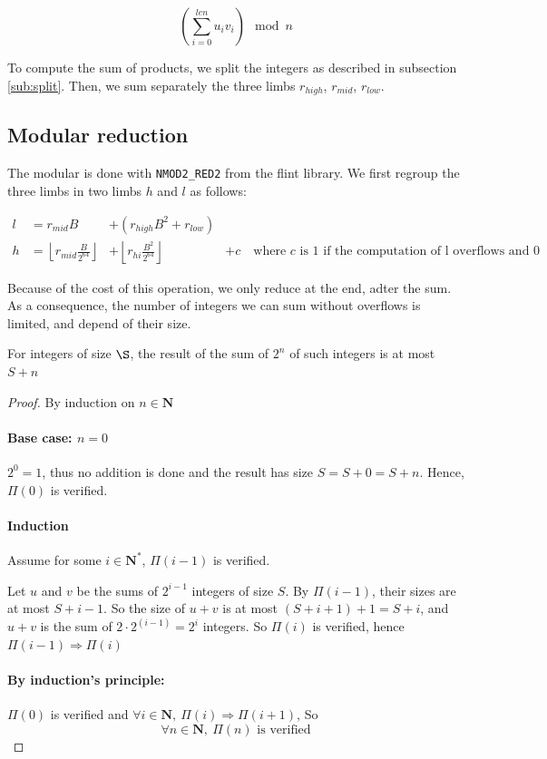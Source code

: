 \documentclass[a4paper]{article}
\begin{document}
\[\left(\sum_{i=0}^{len}u_iv_i\right) \mod n\]

To compute the sum of products, we split the integers as described in subsection \ref{sub:split}. Then, we sum separately the three limbs $r_{high}$, $r_{mid}$, $r_{low}$. %

\subsection{Modular reduction}

The modular is done with \texttt{NMOD2\_RED2} from the flint library. We first regroup the three limbs in two limbs $h$ and $l$ as follows:

\begin{align}
    l &= r_{mid}B &+ \left(r_{high}B^2 + r_{low}\right) \\
    h &= \left\lfloor r_{mid}\frac{B}{2^{64}}\right\rfloor &+ \left\lfloor r_{hi}\frac{B^2}{2^{64}}\right\rfloor &+ c \quad{\text{where $c$ is $1$ if the computation of l overflows and 0 otherwise}}
\end{align}

Because of the cost of this operation, we only reduce at the end, adter the sum. As a consequence, the number of integers we can sum without overflows is limited, and depend of their size.

\begin{proposition}\label{prop:sum}
    For integers of size $\S$, the result of the sum of $2^n$ of such integers is at most $S + n$
\end{proposition}

\begin{proof}
    By induction on $n\in\mathbf{N}$

    \paragraph{Base case: $n = 0$}
    $2^0 = 1$, thus no addition is done and the result has size $S = S + 0 = S + n$. Hence, $\Pi(0)$ is verified.

    \paragraph{Induction}
    Assume for some $i \in \mathbf{N}^*$, $\Pi(i - 1)$ is verified.

    Let $u$ and $v$ be the sums of $2^{i-1}$ integers of size $ S $. By $\Pi(i-1)$, their sizes are at most $S + i - 1$. So the size of $u + v$ is at most $\left(S + i + 1\right) + 1 = S + i$, and $u + v$ is the sum of $2 \cdot 2^(i-1) = 2^i$ integers.
    So $\Pi(i)$ is verified, hence $\Pi(i-1) \Rightarrow \Pi(i)$

    \paragraph{By induction's principle:} $\Pi(0)$ is verified and $\forall i\in\mathbf{N},\ \Pi(i) \Rightarrow \Pi(i+1)$, So
    \begin{displaymath}
        \forall n\in\mathbf{N},\ \Pi(n)\text{ is verified}
    \end{displaymath}
\end{proof}
\end{document}
